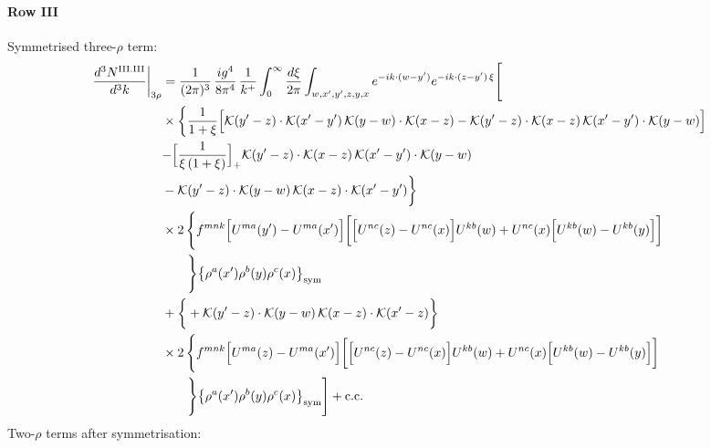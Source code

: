 \documentclass[9pt]{article}
\numberwithin{equation}{section}
\begin{document}
\paragraph*{Row III}
Symmetrised three-$\rho$ term:
\begin{align}
\frac{d^{3}N^{\rm III.III}}{d^{3}k}\bigg|_{3\rho}&=\frac{1}{(2\pi)^{3}}\,\frac{ig^{4}}{8\pi^{4}}\,\frac{1}{k^{+}}\int_{0}^{\infty}\frac{d\xi}{2\pi}\int_{w,x',y',z,y,x}e^{-ik\cdot(w-y')}e^{-ik\cdot(z-y')\,\xi}\Bigg[\notag\\
&\times\bigg\{\frac{1}{1+\xi}\Big[\mathcal{K}(y'-z)\cdot\mathcal{K}(x'-y')\,\mathcal{K}(y-w)\cdot\mathcal{K}(x-z)-\mathcal{K}(y'-z)\cdot\mathcal{K}(x-z)\,\mathcal{K}(x'-y')\cdot\mathcal{K}(y-w)\Big]\notag\\
&{-\Big[\frac{1}{\xi\,(1+\xi)}\Big]_{+}\mathcal{K}(y'-z)\cdot\mathcal{K}(x-z)\,\mathcal{K}(x'-y')\cdot\mathcal{K}(y-w)}\notag\\
&-\mathcal{K}(y'-z)\cdot\mathcal{K}(y-w)\,\mathcal{K}(x-z)\cdot\mathcal{K}(x'-y')\bigg\}\notag\\
&\times 2\,\Bigg\{f^{mnk}\Big[U^{ma}(y')-U^{ma}(x')\Big]\bigg[\Big[U^{nc}(z)-U^{nc}(x)\Big]U^{kb}(w)+U^{nc}(x)\Big[U^{kb}(w)-U^{kb}(y)\Big]\bigg]\notag\\&\qquad\Bigg\}\big\{\rho^{a}(x')\rho^{b}(y)\rho^{c}(x)\big\}_{\rm sym}\notag\\
&+\bigg\{+\mathcal{K}(y'-z)\cdot\mathcal{K}(y-w)\,\mathcal{K}(x-z)\cdot\mathcal{K}(x'-z)\bigg\}\notag\\
&\times 2\,\Bigg\{f^{mnk}\Big[U^{ma}(z)-U^{ma}(x')\Big]\bigg[\Big[U^{nc}(z)-U^{nc}(x)\Big]U^{kb}(w)+U^{nc}(x)\Big[U^{kb}(w)-U^{kb}(y)\Big]\bigg]\notag\\&\qquad\Bigg\}\big\{\rho^{a}(x')\rho^{b}(y)\rho^{c}(x)\big\}_{\rm sym}\Bigg]+{\rm c.c.}\label{eq:H-III.III-3}
\end{align}
 Two-$\rho$ terms after symmetrisation:
\end{document}
